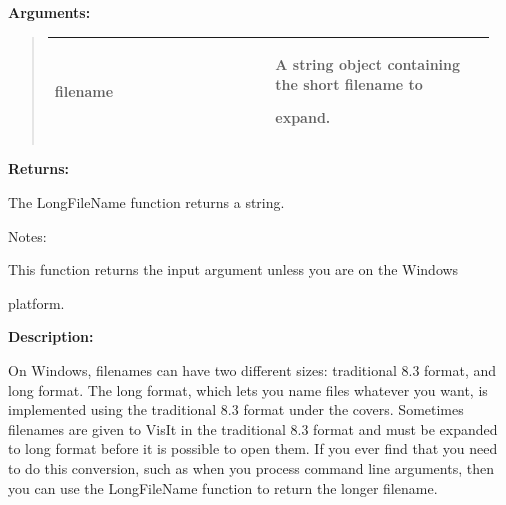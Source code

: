 \documentclass[letterpaper,10pt,english]{sphinxmanual}
\begin{document}
\begin{DUlineblock}{0em}
\item[] 
\item[] \textbf{Arguments:}
\end{DUlineblock}
\begin{quote}

\begin{tabular}{|p{0.475\linewidth}|p{0.475\linewidth}|}
\hline

filename
 & 
\begin{DUlineblock}{0em}
\item[] A string object containing the short filename to
\item[] expand.
\end{DUlineblock}
\\
\hline\end{tabular}

\end{quote}

\begin{DUlineblock}{0em}
\item[] 
\item[] \textbf{Returns:}
\item[] The LongFileName function returns a string.
\item[] Notes:
\item[] This function returns the input argument unless you are on the Windows
\item[] platform.
\item[] 
\item[] \textbf{Description:}
\item[] On Windows, filenames can have two different sizes: traditional 8.3
format, and long format. The long format, which lets you name files
whatever you want, is implemented using the traditional 8.3 format under
the covers. Sometimes filenames are given to VisIt in the traditional 8.3
format and must be expanded to long format before it is possible to open
them. If you ever find that you need to do this conversion, such as when
you process command line arguments, then you can use the LongFileName
function to return the longer filename.
\end{DUlineblock}

\begin{DUlineblock}{0em}
\item[] 
\end{DUlineblock}
\end{document}
